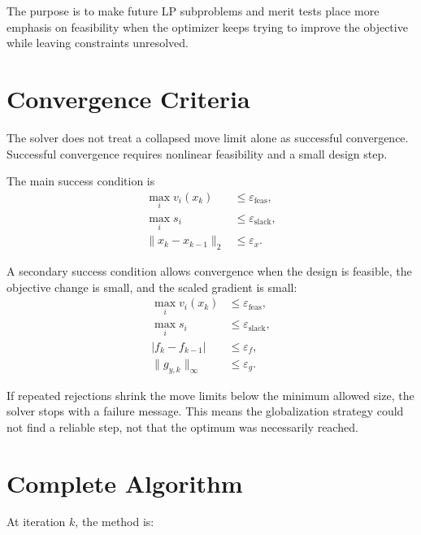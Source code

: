 \documentclass[11pt,a4paper]{article}
\begin{document}
The purpose is to make future LP subproblems and merit tests place more emphasis
on feasibility when the optimizer keeps trying to improve the objective while
leaving constraints unresolved.

\section{Convergence Criteria}

The solver does not treat a collapsed move limit alone as successful
convergence. Successful convergence requires nonlinear feasibility and a small
design step.

The main success condition is
\begin{align}
    \max_i v_i(x_k) &\leq \varepsilon_{\text{feas}}, \\
    \max_i s_i &\leq \varepsilon_{\text{slack}}, \\
    \|x_k - x_{k-1}\|_2 &\leq \varepsilon_x.
\end{align}

A secondary success condition allows convergence when the design is feasible,
the objective change is small, and the scaled gradient is small:
\begin{align}
    \max_i v_i(x_k) &\leq \varepsilon_{\text{feas}}, \\
    \max_i s_i &\leq \varepsilon_{\text{slack}}, \\
    |f_k - f_{k-1}| &\leq \varepsilon_f, \\
    \|g_{y,k}\|_\infty &\leq \varepsilon_g.
\end{align}

If repeated rejections shrink the move limits below the minimum allowed size,
the solver stops with a failure message. This means the globalization strategy
could not find a reliable step, not that the optimum was necessarily reached.

\section{Complete Algorithm}

At iteration \(k\), the method is:
\end{document}
